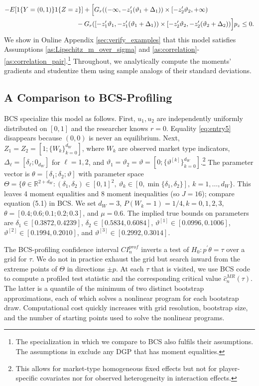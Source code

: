 \documentclass[letterpaper,11pt]{article}
\theoremstyle{myplain}
\theoremstyle{mydefinition}
\theoremstyle{myremark}
\renewcommand{\cite}{\citet}
\newcommand{\R}{\mathbb{R}}
\numberwithin{equation}{section}
\numberwithin{figure}{section}
\begin{document}
\begin{appendix}
\begin{align}
	-&E[1\{Y=(0,1)\}1\{Z=z\}]
	+\Big[G_r((-\infty,-z_1'(\vartheta_1+\Delta_1))\times [-z_2'\vartheta_2,+\infty)\notag\\
 &\hspace{3.6cm}	-G_r([-z_1'\vartheta_1,-z_1'(\vartheta_1+\Delta_1))\times [-z_2'\vartheta_2,-z_2'(\vartheta_2+\Delta_2))\Big]p_z\le 0.\label{eq:entry8}
\end{align}
We show in Online Appendix \ref{sec:verify_examples} that this model satisfies Assumptions \ref{as:Lipschitz_m_over_sigma} and \ref{as:correlation}-\ref{as:correlation_pair}.\footnote{The specialization in which we compare to BCS also fulfils their assumptions. The assumptions in \cite{PakesPorterHo2011} exclude any DGP that has moment equalities.} Throughout, we analytically compute the moments' gradients and studentize them using sample analogs of their standard deviations.

\subsection{A Comparison to BCS-Profiling}
\label{sec:MC_results}
BCS specialize this model as follows. First, $u_1,u_2$ are independently uniformly distributed on $[0,1]$ and the researcher knows $r=0$. Equality \eqref{eq:entry5} disappears because $(0,0)$ is never an equilibrium. Next, $Z_1=Z_2=[1; \{W_k\}_{k=0}^{d_W}]$, where $W_k$ are observed market type indicators, $\Delta_\ell = [\delta_\ell; 0_{d_W}]$ for $\ell=1,2$, and $\vartheta_1=\vartheta_2 =\vartheta = [0;\{\vartheta^{[k]}\}_{k=0}^{d_W}]$.\footnote{This allows for market-type homogeneous fixed effects but not for player-specific covariates nor for observed heterogeneity in interaction effects.} The parameter vector is $\theta=[\delta_1;\delta_2;\vartheta]$ with parameter space $\Theta = \{\theta \in \R^{2+d_W}: (\delta_1,\delta_2)\in [0,1]^2,~\vartheta_k \in [0,\min\{\delta_1,\delta_2\}],~k=1,\dots,d_W\}$. This leaves 4 moment equalities and 8 moment inequalities (so $J = 16$); compare equation (5.1) in BCS. We set $d_W=3$, $P(W_k=1)=1/4,k=0,1,2,3$, $\theta = [0.4 ; 0.6 ;0.1  ;0.2  ;0.3]$, and $\mu=0.6$. The implied true bounds on parameters are $\delta_1 \in [0.3872,0.4239]$, $\delta_2 \in [0.5834,0.6084]$, $\vartheta^{[1]}\in [0.0996, 0.1006]$, $\vartheta^{[2]} \in [0.1994,0.2010]$, and $\vartheta^{[3]} \in [0.2992,0.3014]$.

The BCS-profiling confidence interval $CI_n^{prof}$ inverts a test of $H_0:p^\prime \theta=\tau$ over a grid for $\tau$. We do not in practice exhaust the grid but search inward from the extreme points of $\Theta$ in directions $\pm p$. At each $\tau$ that is visited, we use BCS code to compute a profiled test statistic and the corresponding critical value $\hat{c}_n^{MR}(\tau)$. The latter is a quantile of the minimum of two distinct bootstrap approximations, each of which solves a nonlinear program for each bootstrap draw. Computational cost quickly increases with grid resolution, bootstrap size, and the number of starting points used to solve the nonlinear programs.


\end{appendix}
\end{document}
